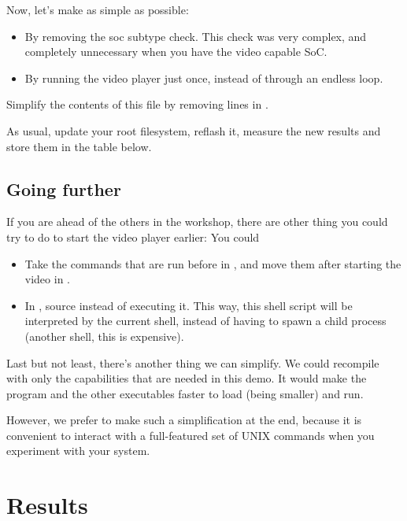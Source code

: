 Now, let's make  as simple as possible:

\begin{itemize}
\item By removing the soc subtype check.
      This check was very complex, and completely unnecessary
      when you have the video capable SoC.
\item By running the video player just once, instead of through
      an endless  loop.
\end{itemize}

Simplify the contents of this file by removing lines
in .

As usual, update your root filesystem, reflash it, measure the
new results and store them in the table below.

\subsection{Going further}

If you are ahead of the others in the workshop, there are
other thing you could try to do to start the video player earlier: You could

\begin{itemize}
\item Take the commands that are run before  in
      , and move them after starting the video in
      .
\item In , source  instead of
      executing it. This way, this shell script will be interpreted
      by the current shell, instead of having to spawn a child process
      (another shell, this is expensive).
\end{itemize}

Last but not least, there's another thing we can simplify. We could
recompile  with only the capabilities that are needed
in this demo. It would make the  program and the other
executables faster to load (being smaller) and run.

However, we prefer to make such a simplification at the end, because
it is convenient to interact with a full-featured set of UNIX commands
when you experiment with your system.

\section{Results}

